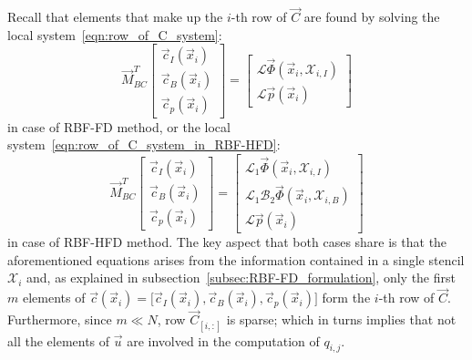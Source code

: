 Recall that elements that make up the $i$-th row of $\vec{C}$ are found by solving the local system~\eqref{eqn:row_of_C_system}:
\begin{equation}
	\label{eqn:local_RBF-FD_system_adjoint_1D}
	\vec{M}_{BC}^T
	\begin{bmatrix}
		\vec{c}_I(\vec{x}_i)  \\
		\vec{c}_B(\vec{x}_i)  \\
		\vec{c}_p(\vec{x}_i)
	\end{bmatrix} = 
	\begin{bmatrix}
		\mathcal{L} \vec{\Phi}(\vec{x}_i, \mathcal{X}_{i,I})  \\
		\mathcal{L} \vec{p}(\vec{x}_i)
	\end{bmatrix}
\end{equation}
in case of RBF-FD method, or the local system~\eqref{eqn:row_of_C_system_in_RBF-HFD}:
\begin{equation}
	\label{eqn:adjoint_method_row_of_C_system_in_RBF-HFD}
	\vec{M}_{BC}^T
	\begin{bmatrix}
		\vec{c}_I(\vec{x}_i)  \\
		\vec{c}_B(\vec{x}_i)  \\
		\vec{c}_p(\vec{x}_i)
	\end{bmatrix} = 
	\begin{bmatrix}
		\mathcal{L}_1 \vec{\Phi}(\vec{x}_i, \mathcal{X}_{i,I})  			  \\
		\mathcal{L}_1 \mathcal{B}_2 \vec{\Phi}(\vec{x}_i, \mathcal{X}_{i,B})  \\
		\mathcal{L} \vec{p}(\vec{x}_i)
	\end{bmatrix}
\end{equation}
in case of RBF-HFD method. The key aspect that both cases share is that the aforementioned equations arises from the information contained in a single stencil $\mathcal{X}_i$ and, as explained in subsection~\vref{subsec:RBF-FD_formulation}, only the first $m$ elements of $\vec{c}(\vec{x}_i) = \bigl[ \vec{c}_I(\vec{x}_i), \vec{c}_B(\vec{x}_i), \vec{c}_p(\vec{x}_i) \bigr]$ form the $i$-th row of $\vec{C}$. 
Furthermore, since $m \ll N$, row $\vec{C}_{[i,:]}$ is sparse; which in turns implies that not all the elements of $\vec{u}$ are involved in the computation of $q_{i,j}$.

